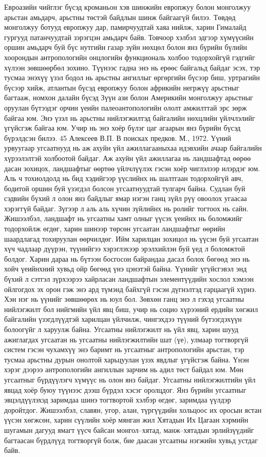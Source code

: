 Евроазийн чийглэг бүсэд кроманьон хэв шинжийн европжуу болон монголжуу арьстан амьдарч, арьстны төстэй байдлын шинж байгаагүй билээ. Төвдөд монголжуу ботууд европжуу дар, памирчуудтай хаяа нийлж, харин Гималайд гургууд патанчуудтай зэрэгцэн амьдарч байв. Товчоор хэлбэл эдгээр хүмүүсийн оршин амьдарч буй бүс нутгийн газар зүйн нөхцөл болон янз бүрийн бүлийн хоорондын антропологийн онцлогийн функциональ холбоо тодорхойгүй гэдгийг хүлээн зөвшөөрбөл зохино. Түүнээс гадна энэ нь ерөөс байгальд байдаг эсэх, тэр тусмаа энэхүү үзэл бодол нь арьстны ангиллыг өргөргийн бүсээр биш, уртрагийн бүсээр хийж, атлантын бүсэд европжуу болон африкийн негржүү арьстныг багтааж, номхон далайн бүсэд Зүүн ази болон Америкийн монголжуу арьстныг оруулан бүтээдэг орчин үеийн палеоантопологийн ололт амжилттай эрс зөрж байгаа юм. Энэ үзэл нь арьстны нийлэгжилтэд байгалийн нөхцлийн үйлчлэлийг үгүйсгэж байгаа юм. Учир нь энэ хоёр бүлэг цаг агаарын янз бүрийн бүсэд бүрэлдсэн билээ.
45 Алексеев В.П. В поисках предков. М., 1972.
Үүний урвуугаар угсаатнууд нь аж ахуйн үйл ажиллагааныхаа идэвхийн ачаар байгалийн хүрээлэлтэй холбоотой байдаг. Аж ахуйн үйл ажиллагаа нь ландшафтад өөрөө дасан зохицох, ландшафтыг өөртөө үйлчлүүлэх гэсэн хоёр чиглэлээр илэрдэг юм. Аль ч тохиолдолд нь бид хэдийгээр үүслийнх нь шалтгаан тодорхойгүй авч, бодитой оршин буй үзэгдэл болсон угсаатнуудтай тулгарч байна.
Судлан буй сэдвийн бүхий л олон янз байдлыг ямар нэгэн ганц зүйл рүү овоолох угаасаа хэрэггүй байдаг. Зүгээр л аль аль хүчин зүйлийнх нь ролийг тогтоох нь сайн. Жишээлбэл, ландшафт нь угсаатны хамт олныг үүсэх үеийнх нь боломжийг тодорхойлж өгдөг, харин шинээр төрсөн угсаатан ландшафтыг өөрийн шаардлагад тохируулан өөрчилдөг. Ийм харилцан зохицол нь үүсэн буй угсаатан хүч чадлаар дүүрэн, түүнийгээ хэрэглэхээр эрэлхийлэн буй үед л боломжтой болдог. Харин дараа нь бүтээн босгосон байрандаа дасал болох бөгөөд энэ нь хойч үеийнхний хувьд ойр бөгөөд үнэ цэнэтэй байна. Үүнийг үгүйсгэвэл энд бүхий л сэтгэл зүрхээрээ хайрласан ландшафтын элементүүдийн хослол хэмээн ойлгогдох эх орон гэж энэ ард түмэнд байхгүй гэсэн дүгнэлтэд гарцаагүй хүрнэ. Хэн нэг нь үүнийг зөвшөөрөх нь юул бол.
Зөвхөн ганц энэ л гэхэд угсаатны нийлэгжилт бол нийгмийн үйл явц биш, учир нь социо хүрээний ердийн хөгжил байгалийн үзэгдлүүдтэй харилцан үйлчилж, чингэхдээ түүний бүтээгдэхүүн болоогүйг л харуулж байна.
Угсаатны нийлэгжилт нь үйл явц, харин шууд ажиглагдах угсаатан нь угсаатны нийлэгжилтийн шат (үе), улмаар тогтворгүй систем гэсэн чухамхүү энэ баримт нь угсаатныг антропологийн арьстан, тэр тусмаа арьстны дурын онолтой харьцуулан үзэх явдлыг үгүйсгэж байна. Үнэн хэрэг дээрээ антропологийн ангиллын зарчим нь адил төст байдал юм. Мөн угсаатныг бүрдүүлэгч хүмүүс нь олон янз байдаг. Угсаатны нийлэгжилтийн үйл явцад хоёр буюу түүнээс дээш бүрдэл хэсэг оролцдог. Янз бүрийн угсаатныг эвцэлдүүлэхэд заримдаа шинэ тогтвортой хэлбэр өгдөг, заримдаа үүлдэр доройтдог. Жишээлбэл, славян, угор, алан, түргүүдийн хольцоос их оросын ястан үүсэн хөгжсөн, харин сүүлийн хоёр мянган жил Хятадын Их Цагаан хэрмийн шугамын дагууд ямагт үүсч байсан монгол–хятад, манж–хятадын эрлийзүүдийг багтаасан бүрдлүүд тогтворгүй болж, бие даасан угсаатны нэгжийн хувьд устдаг байв.

